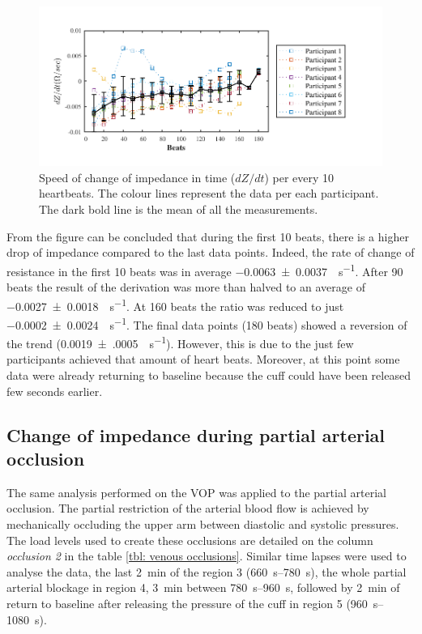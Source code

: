 \begin{figure}[htbp]
	\centering
	\includegraphics[width=15cm,keepaspectratio]{figure_vop_3}    
	\caption[Rate of change of impedance per 10 heartbeats during venous occlusion]{Speed of change of impedance in time ($dZ/dt$) per every 10 heartbeats. The colour lines represent the data per each participant. The dark bold line is the mean of all the measurements.}
	\label{fig:venous occlusion change}
\end{figure}

From the figure can be concluded that during the first 10 beats, there is a higher drop of impedance compared to the last data points. Indeed, the rate of change of resistance in the first 10 beats was in average \SI{-0.0063(00037)}{\Omega\per\second}. After 90 beats the result of the derivation was more than halved to an average of \SI{-0.0027(00018)}{\Omega\per\second}. At 160 beats the ratio was reduced to just \SI{-0.0002(00024)}{\Omega\per\second}. The final data points (180 beats) showed a reversion of the trend (\SI{0.0019(0005)}{\Omega\per\second}). However, this is due to the just few participants achieved that amount of heart beats.  Moreover, at this point some data were already returning to baseline because the cuff could have been released few seconds earlier.  


\subsection{Change of impedance during partial arterial occlusion}
\label{section occlusion 1.2}
The same analysis performed on the VOP was applied to the partial arterial occlusion. The partial restriction of the arterial blood flow is achieved by mechanically occluding the upper arm between diastolic and systolic pressures. The load levels used to create these occlusions are detailed on the column \textit{occlusion 2} in the table \ref{tbl: venous occlusions}. Similar time lapses were used to analyse the data, the last \SI{2}{\minute} of the region 3 (\SIrange{660}{780}{\second}), the whole partial arterial blockage in region 4, \SI{3}{\minute} between \SIrange{780}{960}{\second}, followed by \SI{2}{\minute} of return to baseline after releasing the pressure of the cuff in region 5 (\SIrange{960}{1080}{\second}).

